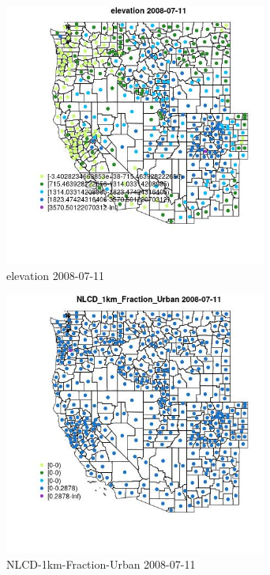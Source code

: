 \begin{figure} 
\centering  
\includegraphics[width=0.77\textwidth]{Code_Outputs/df_report_ML_predictors_CountyCentroid_Locations_Dates_2008-01-01to2018-12-31_MapObselevation2008-07-11.jpg} 
\caption{\label{fig:df_report_ML_predictors_CountyCentroid_Locations_Dates_2008-01-01to2018-12-31MapObselevation2008-07-11}elevation 2008-07-11} 
\end{figure} 
 

\begin{figure} 
\centering  
\includegraphics[width=0.77\textwidth]{Code_Outputs/df_report_ML_predictors_CountyCentroid_Locations_Dates_2008-01-01to2018-12-31_MapObsNLCD_1km_Fraction_Urban2008-07-11.jpg} 
\caption{\label{fig:df_report_ML_predictors_CountyCentroid_Locations_Dates_2008-01-01to2018-12-31MapObsNLCD_1km_Fraction_Urban2008-07-11}NLCD-1km-Fraction-Urban 2008-07-11} 
\end{figure} 
 

